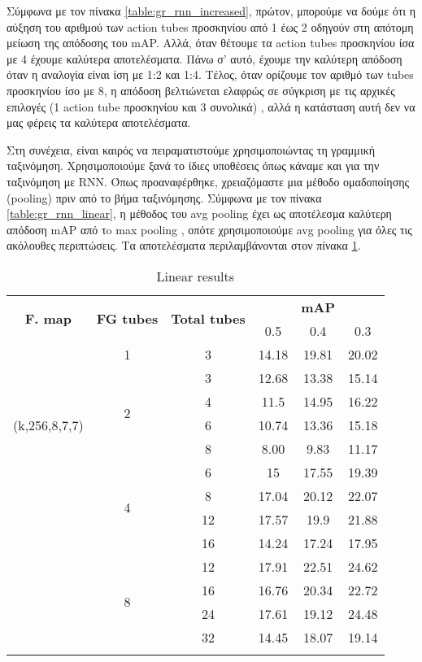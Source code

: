 Σύμφωνα με τον πίνακα  \ref{table:gr_rnn_increased}, πρώτον, μπορούμε να δούμε ότι η αύξηση του αριθμού των
\en action tubes \gr προσκηνίου από 1 έως 2 οδηγούν στη απότομη μείωση της  απόδοσης του \en mAP\gr.
Αλλά, όταν θέτουμε τα \en action tubes \gr προσκηνίου ίσα με 4 έχουμε καλύτερα αποτελέσματα. Πάνω σ' αυτό,
έχουμε την καλύτερη απόδοση όταν η αναλογία είναι ίση με 1:2 και 1:4. Τέλος, όταν
 ορίζουμε τον αριθμό των \en tubes \gr προσκηνίου ίσο με 8, η απόδοση βελτιώνεται ελαφρώς
σε σύγκριση με τις αρχικές επιλογές (1 \en action tube \gr προσκηνίου και 3 συνολικά) , αλλά η κατάσταση αυτή δεν
να μας φέρεις τα καλύτερα αποτελέσματα. \par
Στη συνέχεια, είναι καιρός να πειραματιστούμε χρησιμοποιώντας τη γραμμική ταξινόμηση. Χρησιμοποιούμε ξανά το
ίδιες υποθέσεις όπως κάναμε και για την ταξινόμηση με \en RNN\gr. Όπως προαναφέρθηκε, χρειαζόμαστε μια
μέθοδο ομαδοποίησης (\en pooling\gr) πριν από το βήμα ταξινόμησης. Σύμφωνα με τον πίνακα \ref{table:gr_rnn_linear}, η μέθοδος
του \en avg pooling \gr έχει ως αποτέλεσμα καλύτερη απόδοση \en mAP \gr από τo \en max pooling \gr, οπότε χρησιμοποιούμε \en avg pooling \gr
 για όλες τις ακόλουθες περιπτώσεις. Τα αποτελέσματα περιλαμβάνονται στον πίνακα \ref{table:gr_linear_increased}.
 \begin{center}
   \en
  \begin{longtable}{|| c | c | c || c c c||}
    \hline
    \multirow{2}{*}{\textbf{F. map}} & \multirow{2}{*}{\textbf{FG tubes}} & \multirow{2}{*}{\textbf{Total tubes}} & {} & \textbf{mAP} & {} \\
    {}  & {} & {} & 0.5 & 0.4 & 0.3 \\
    \hline
    \multirow{7}{*}{(k,256,8,7,7)}  & 1 & 3& 14.18 &19.81 & 20.02 \\
    \cline{2-6}
    {} & \multirow{4}{*}{2} & 3 & 12.68 & 13.38 & 15.14 \\
    \cline{3-6}
    {} & {} & 4 & 11.5 & 14.95 & 16.22 \\
    \cline{3-6}
    {} & {} & 6 & 10.74 & 13.36 & 15.18 \\
    \cline{3-6}
    {} & {} & 8 & 8.00 & 9.83 & 11.17 \\
    \cline{2-6}
    {} & \multirow{4}{*}{4} & 6 & 15 & 17.55 & 19.39 \\
    \cline{3-6}
    {} & {} & 8 & 17.04	& 20.12 &22.07 \\
    \cline{3-6}
    {} & {} & 12 & 17.57 & 19.9 & 21.88 \\
    \cline{3-6}
    {} & {} & 16 & 14.24 & 17.24 & 17.95 \\

    \cline{2-6}
    {} & \multirow{4}{*}{8} & 12 & 17.91 & 22.51 & 24.62 \\
    \cline{3-6}
    {} & {} & 16 & 16.76 & 20.34 & 22.72 \\
    \cline{3-6}
    {} & {} & 24 & 17.61 & 19.12 & 24.48 \\
    \cline{3-6}
    {} & {} & 32 & 14.45 & 18.07 & 19.14  \\
    \hline

    \caption{Linear results }
    \label{table:gr_linear_increased}
  \end{longtable}
\end{center}

